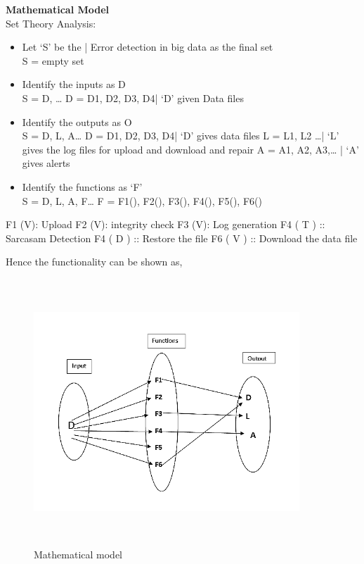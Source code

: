 \documentclass[oneside,a4paper,12pt]{book}
\begin{document}
\textbf{Mathematical Model}\\
Set Theory Analysis:
\begin{itemize}
    \item Let ‘S’ be the | Error detection in big data as the final set\\
S = {empty set} 
\item Identify the inputs as D\\
S = {D, …}
D = {D1, D2, D3, D4| ‘D’ given Data files}

\item Identify the outputs as O\\
S = {D, L, A…}
D = {D1, D2, D3, D4| ‘D’ gives data files}
L = {L1, L2 …| ‘L’ gives the log files for upload and download and repair}
A = {A1, A2, A3,… | ‘A’ gives alerts }

\item Identify the functions as ‘F’\\
S = {D, L, A, F…}
F = {F1(), F2(), F3(), F4(), F5(), F6() }
\end{itemize}
F1 (V): Upload
F2 (V): integrity check 
F3 (V): Log generation
F4 ( T ) :: Sarcasam Detection
F4 ( D ) :: Restore the file
F6 ( V ) :: Download the data file

Hence the functionality can be shown as,
\begin{figure}[h!]
  \centering
  \includegraphics[height=10cm, width=10cm]{math.png}
  \caption{Mathematical model}
\end{figure}
\newpage
\end{document}
